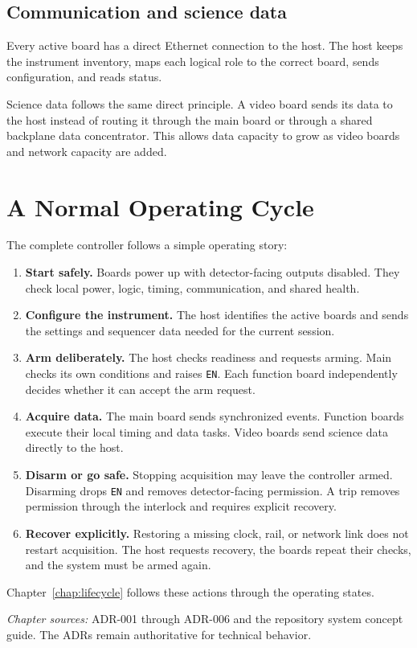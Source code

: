 \subsection{Communication and science data}

Every active board has a direct Ethernet connection to the host. The host keeps the instrument inventory, maps each logical role to the correct board, sends configuration, and reads status.

Science data follows the same direct principle. A video board sends its data to the host instead of routing it through the main board or through a shared backplane data concentrator. This allows data capacity to grow as video boards and network capacity are added.

\section{A Normal Operating Cycle}

The complete controller follows a simple operating story:

\begin{enumerate}
  \item \textbf{Start safely.} Boards power up with detector-facing outputs disabled. They check local power, logic, timing, communication, and shared health.
  \item \textbf{Configure the instrument.} The host identifies the active boards and sends the settings and sequencer data needed for the current session.
  \item \textbf{Arm deliberately.} The host checks readiness and requests arming. Main checks its own conditions and raises \texttt{EN}. Each function board independently decides whether it can accept the arm request.
  \item \textbf{Acquire data.} The main board sends synchronized events. Function boards execute their local timing and data tasks. Video boards send science data directly to the host.
  \item \textbf{Disarm or go safe.} Stopping acquisition may leave the controller armed. Disarming drops \texttt{EN} and removes detector-facing permission. A trip removes permission through the interlock and requires explicit recovery.
  \item \textbf{Recover explicitly.} Restoring a missing clock, rail, or network link does not restart acquisition. The host requests recovery, the boards repeat their checks, and the system must be armed again.
\end{enumerate}

Chapter~\ref{chap:lifecycle} follows these actions through the operating states.

\medskip
\noindent\textit{Chapter sources:} ADR-001 through ADR-006 and the repository system concept guide. The ADRs remain authoritative for technical behavior.
